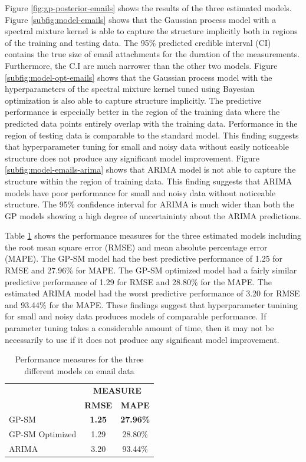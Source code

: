 \documentclass[letterpaper]{article}
\begin{document}
Figure \ref{fig:gp-posterior-emails} shows the results of the three estimated models. Figure \ref{subfig:model-emails} shows that the Gaussian process model with a spectral mixture kernel is able to capture the structure implicitly both in regions of the training and testing data. The 95\% predicted credible interval (CI) contains the true size of email attachments for the duration of the measurements. Furthermore, the C.I are much narrower than the other two models. Figure \ref{subfig:model-opt-emails} shows that the Gaussian process model with the hyperparameters of the spectral mixture kernel tuned using Bayesian optimization is also able to capture structure implicitly. The predictive performance is especially better in the region of the training data where the predicted data points entirely overlap with the training data. Performance in the region of testing data is comparable to the standard model. This finding suggests that hyperparameter tuning for small and noisy data without easily noticeable structure does not produce any significant model improvement. Figure \ref{subfig:model-emails-arima} shows that ARIMA model is not able to capture the structure within the region of training data. This finding suggests that ARIMA models have poor performance for small and noisy data without noticeable structure. The 95\% confidence interval for ARIMA is much wider than both the GP models showing a high degree of uncertaininty about the ARIMA predictions.

Table \ref{tab:performance-measures-emails} shows the performance measures for the three estimated models including the root mean square error (RMSE) and mean absolute percentage error (MAPE). The GP-SM model had the best predictive performance of 1.25 for RMSE and 27.96\% for MAPE. The GP-SM optimized model had a fairly similar predictive performance of 1.29 for RMSE and 28.80\% for the MAPE. The estimated ARIMA model had the worst predictive performance of 3.20 for RMSE and 93.44\% for the MAPE. These findings suggest that hyperparameter tunining for small and noisy data produces models of comparable performance. If parameter tuning takes a considerable amount of time, then it may not be necessarily to use if it does not produce any significant model improvement.

\begin{table}[h]
\caption{Performance measures for the three different models on email data}
\label{tab:performance-measures-emails}
\begin{center}
\begin{tabular}{l@{\qquad}cc}
  \toprule
  \multirow{2}{*}{\raisebox{-\heavyrulewidth}{\bf MODEL}} & \multicolumn{2}{c}{\bf MEASURE} \\
  \cmidrule{2-3}
  & {\bf RMSE} & {\bf MAPE} \\
  \midrule
  GP-SM & {\bf 1.25} & {\bf 27.96\%}  \\
  GP-SM Optimized & 1.29 & 28.80\%  \\
  ARIMA & 3.20 & 93.44\%  \\
  \bottomrule
\end{tabular}
\end{center}
\end{table}
\end{document}
